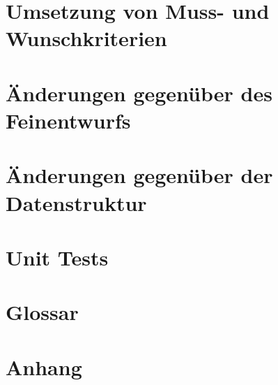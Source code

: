 \documentclass[a4paper]{scrreprt}
\begin{document}
	\chapter{Umsetzung von Muss- und Wunschkriterien}
	
	
	\chapter{Änderungen gegenüber des Feinentwurfs}
	
	\chapter{Änderungen gegenüber der Datenstruktur}
	
	\chapter{Unit Tests}
	
	
	\chapter{Glossar}
	
	\chapter{Anhang}
\end{document}
